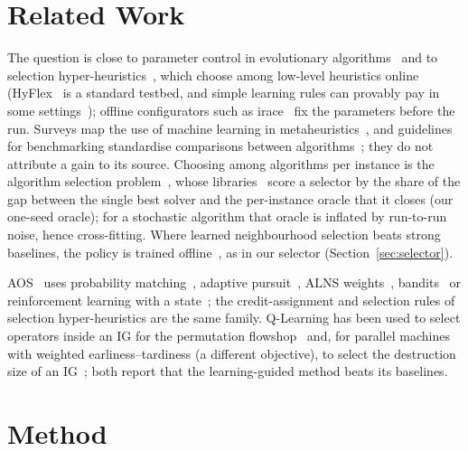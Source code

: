 \documentclass[conference,a4paper]{IEEEtran}
\begin{document}
\section{Related Work}
The question is close to parameter control in evolutionary algorithms~\cite{KarafotiasEtal2015,AletiMoser2016} and to selection hyper-heuristics~\cite{BurkeEtal2013}, which choose among low-level heuristics online (HyFlex~\cite{OchoaEtal2012} is a standard testbed, and simple learning rules can provably pay in some settings~\cite{AlanaziLehre2014});
offline configurators such as irace~\cite{LopezIbanezEtal2016} fix the parameters before the run. Surveys map the use of machine learning in metaheuristics~\cite{KarimiMamaghanEtal2022}, and guidelines for benchmarking standardise comparisons between algorithms~\cite{BartzBeielsteinEtal2020}; they do not attribute a gain to its source.
Choosing among algorithms per instance is the algorithm selection problem~\cite{Rice1976}, whose libraries~\cite{BischlEtal2016} score a selector by the share of the gap between the single best solver and the per-instance oracle that it closes (our one-seed oracle); for a stochastic algorithm that oracle is inflated by run-to-run noise, hence cross-fitting.
Where learned neighbourhood selection beats strong baselines, the policy is trained offline~\cite{SonneratEtal2021}, as in our selector (Section~\ref{sec:selector}).

AOS~\cite{FialhoEtal2010} uses probability matching~\cite{Goldberg1990}, adaptive pursuit~\cite{Thierens2005}, ALNS weights~\cite{PisingerRopke2007}, bandits~\cite{AuerEtal2002,DaCostaEtal2008} or reinforcement learning with a state~\cite{SharmaEtal2019}; the credit-assignment and selection rules of selection hyper-heuristics are the same family.
Q-Learning has been used to select operators inside an IG for the permutation flowshop~\cite{KarimiMamaghanEtal2023} and, for parallel machines with weighted earliness--tardiness (a different objective), to select the destruction size of an IG~\cite{MissaouiOSullivan2026}; both report that the learning-guided method beats its baselines.

\section{Method}
\end{document}
